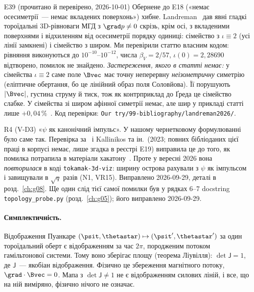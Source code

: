 \begin{established}{E39 (прочитано й перевірено, 2026-10-01)}
Обернене до E18 («немає осесиметрії~--- немає вкладених поверхонь») хибне. Landreman~\cite{Landreman2026} дав явні гладкі тороїдальні 3D-рівноваги МГД з $\grad p\ne0$ скрізь, крім осі, з вкладеними поверхнями і відхиленням від осесиметрії порядку одиниці: сімейство з $\iota\equiv2$ (усі лінії замкнені) і сімейство з широм. Ми перевірили статтю власним кодом: рівняння виконуються до $10^{-10}$--$10^{-12}$, числа $\beta_V=2/57$, $\iota(0)=2{,}28690$ відтворено, помилок не знайдено. \emph{Застереження, якого в статті немає:} у сімейства $\iota\equiv2$ саме поле $\Bvec$ має точну неперервну \emph{неізометричну} симетрію (еліптичне обертання, бо це лінійний образ поля Соловйова). Її порушують $|\Bvec|$, густина струму й тиск, тож як контрприклад до Ґреда це сімейство слабке. У сімейства зі широм афінної симетрії немає, але шир у прикладі статті лише $+0{,}04\,\%$~\cite{RegEst}. Код перевірки: \texttt{Our try/99-bibliography/landreman2026/}.  %
\end{established}

\begin{refuted}{R4 (V-D3)}
«$\psi$ як канонічний імпульс». У нашому чернетковому формулюванні було саме так. Перевірка за~\cite{Escande2024} і Kallinikos та ін.~(2023; повних бібліоданих цієї праці в корпусі немає, лише згадка в реєстрі E19) виправила це до того, як помилка потрапила в матеріали хакатону~\cite{RegVerif}. Проте у вересні 2026 вона \emph{повторилася} в коді \texttt{tokamak-3d-viz}: ширину острова рахували з $\psi$ як імпульсом і завищували в $\sqrt q$ разів (N1, VR15). Виправлено 2026-09-29, деталі в розд.~\ref{ch:g08}. Ще один слід тієї самої помилки був у рядках 6--7 docstring \texttt{topology\_probe.py} (розд.~\ref{ch:g05}); його виправлено 2026-09-29.
\end{refuted}

\paragraph{Симплектичність.} Відображення Пуанкаре $(\psit,\thetastar)\mapsto(\psit',{\thetastar}')$ за один тороїдальний оберт є відображенням за час $2\pi$, породженим потоком гамільтонової системи. Тому воно зберігає площу (теорема Ліувілля): $\det\mathsf J=1$, де $\mathsf J$~--- якобіан відображення. Фізично це збереження магнітного потоку, $\grad\cdot\Bvec=0$. Мапа з $\det\mathsf J\ne1$ не є відображенням силових ліній, і все, що на ній виміряно, фізично нічого не означає.

